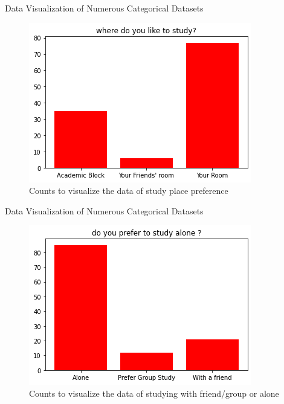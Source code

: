 \documentclass{beamer}
\begin{document}
\begin{frame}
\begin{block}{Data Visualization of Numerous Categorical Datasets}
\begin{figure}[hbtp]
\caption{Counts to visualize the data of study place preference}
\centering
\includegraphics[scale=0.60]{wherestudy.png}
\end{figure}
\end{block}
\end{frame}

\begin{frame}
\begin{block}{Data Visualization of Numerous Categorical Datasets}
\begin{figure}[hbtp]
\caption{Counts to visualize the data of studying with friend/group or alone}
\centering
\includegraphics[scale=0.60]{study alone.png}
\end{figure}
\end{block}
\end{frame}
\end{document}
